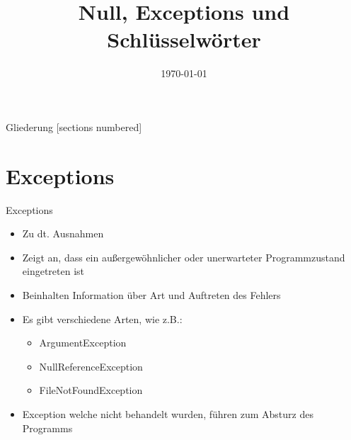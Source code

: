 



\title{Null, Exceptions und Schlüsselwörter}
\date{\today}




\maketitle

\begin{frame}{Gliederung}
	[sections numbered]
	\tableofcontents
\end{frame}


\section{Exceptions}
\begin{frame}{Exceptions}
	\begin{itemize}
		\item Zu dt. Ausnahmen
		\item Zeigt an, dass ein außergewöhnlicher oder unerwarteter Programmzustand eingetreten ist
		\item Beinhalten Information über Art und Auftreten des Fehlers
		\item Es gibt verschiedene Arten, wie z.B.:
		\begin{itemize} 
			\item ArgumentException
			\item NullReferenceException	
			\item FileNotFoundException
		\end{itemize}
		\item Exception welche nicht behandelt wurden, führen zum Absturz des Programms
	\end{itemize}
\end{frame}

